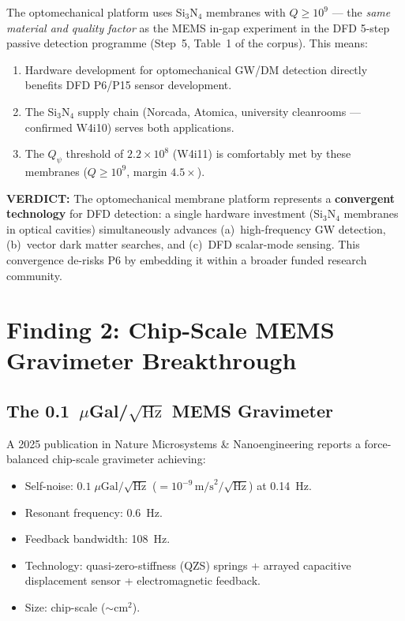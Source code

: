 \documentclass[11pt]{article}
\theoremstyle{definition}
\theoremstyle{remark}
\newcommand{\ee}[1]{\times10^{#1}}
\newcommand{\Qpsi}{Q_\psi}
\newcommand{\verdict}[1]{\textcolor{green!50!black}{\textbf{VERDICT:} #1}}
\begin{document}
The optomechanical platform uses Si$_3$N$_4$ membranes with
$Q \geq 10^9$ --- the \emph{same material and quality factor} as the
MEMS in-gap experiment in the DFD 5-step passive detection programme
(Step~5, Table~1 of the corpus). This means:

\begin{enumerate}[nosep]
\item Hardware development for optomechanical GW/DM detection directly
  benefits DFD P6/P15 sensor development.
\item The Si$_3$N$_4$ supply chain (Norcada, Atomica, university
  cleanrooms --- confirmed W4i10) serves both applications.
\item The $\Qpsi$ threshold of $2.2\ee{8}$ (W4i11) is comfortably
  met by these membranes ($Q \geq 10^9$, margin $4.5\times$).
\end{enumerate}

\verdict{The optomechanical membrane platform represents a
\textbf{convergent technology} for DFD detection: a single hardware
investment (Si$_3$N$_4$ membranes in optical cavities) simultaneously
advances (a)~high-frequency GW detection, (b)~vector dark matter
searches, and (c)~DFD scalar-mode sensing. This convergence de-risks
P6 by embedding it within a broader funded research community.}

\section{Finding 2: Chip-Scale MEMS Gravimeter Breakthrough}
\label{sec:mems}

\subsection{The 0.1~$\mu$Gal/$\sqrt{\mathrm{Hz}}$ MEMS Gravimeter}

A 2025 publication in Nature Microsystems \& Nanoengineering reports
a force-balanced chip-scale gravimeter achieving:

\begin{itemize}[nosep]
\item Self-noise: $0.1\;\mu\mathrm{Gal}/\sqrt{\mathrm{Hz}}$
  ($= 10^{-9}\,\mathrm{m/s}^2/\sqrt{\mathrm{Hz}}$) at 0.14~Hz.
\item Resonant frequency: 0.6~Hz.
\item Feedback bandwidth: 108~Hz.
\item Technology: quasi-zero-stiffness (QZS) springs + arrayed
  capacitive displacement sensor + electromagnetic feedback.
\item Size: chip-scale ($\sim$cm$^2$).
\end{itemize}
\end{document}
